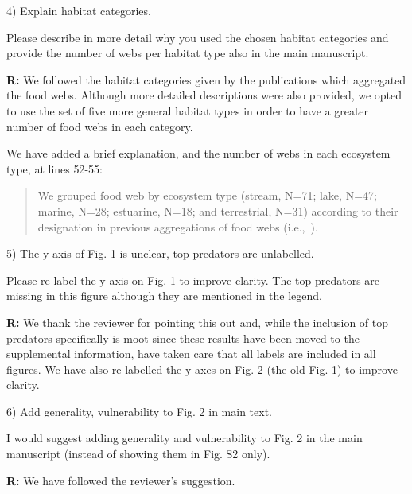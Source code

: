 \documentclass[12pt]{letter}
\newenvironment{refquote}{\bigskip \begin{it}}{\end{it}\smallskip}
\begin{document}
  4) Explain habitat categories.

  \begin{refquote}

    Please describe in more detail why you used the chosen habitat categories
    and provide the number of webs per habitat type also in the main
    manuscript.

  \end{refquote}


  \textbf{R:} We followed the habitat categories given by the publications which
  aggregated the food webs. Although more detailed descriptions were also provided, 
  we opted to use the set of five more general habitat types in order to have a 
  greater number of food webs in each category.


  We have added a brief explanation, and the number of webs in each ecosystem type, at lines 52-55:

  \begin{quotation}
    We grouped food web by ecosystem type (stream, N=71; lake, N=47; marine, N=28; estuarine, N=18;
    and terrestrial, N=31) according to their designation in previous aggregations of food webs 
    (i.e.,~\citet{GlobalWeb,Riede2011,Dunne2013}).
    
  \end{quotation}


  5) The y-axis of Fig. 1 is unclear, top predators are unlabelled.


  \begin{refquote}

    Please re-label the y-axis on Fig. 1 to improve clarity. The top predators
    are missing in this figure although they are mentioned in the legend.

  \end{refquote}


  \textbf{R:} We thank the reviewer for pointing this out 
  and, while the inclusion of top predators specifically
  is moot since these results have been moved to the 
  supplemental information, have taken care that all labels
  are included in all figures. We have also re-labelled the
  y-axes on Fig. 2 (the old Fig. 1) to improve clarity.


  6) Add generality, vulnerability to Fig. 2 in main text.


  \begin{refquote}

    I would suggest adding generality and vulnerability to Fig. 2 in the main
    manuscript (instead of showing them in Fig. S2 only).

  \end{refquote}


  \textbf{R:} We have followed the reviewer's suggestion.


  \newpage



\end{document}
